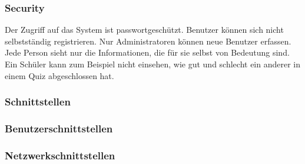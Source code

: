 \subsubsection*{Security}
Der Zugriff auf das System ist passwortgeschützt. Benutzer können sich nicht selbstständig registrieren. Nur Administratoren können neue Benutzer erfassen.
Jede Person sieht nur die Informationen, die für sie selbst von Bedeutung sind. Ein Schüler kann zum Beispiel nicht einsehen, wie gut und schlecht ein anderer in einem Quiz abgeschlossen hat.

\newpage

\subsubsection{Schnittstellen}

\subsubsection*{Benutzerschnittstellen}

\subsubsection*{Netzwerkschnittstellen}


\newpage